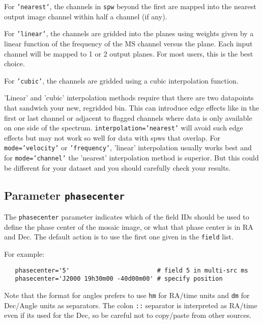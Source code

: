 For {\tt 'nearest'}, the channels in {\tt spw} beyond the first are
mapped into the nearest output image channel within half a channel (if
any).

For {\tt 'linear'}, the channels are gridded into the planes using
weights given by a linear function of the frequency of the MS channel
versus the plane.  Each input channel will be mapped to 1 or 2 output
planes.  For most users, this is the best choice.

For {\tt 'cubic'}, the channels are gridded using a cubic
interpolation function. 

'Linear' and 'cubic' interpolation methods require that there are two
datapoints that sandwich your new, regridded bin. This can introduce
edge effects like in the first or last channel or adjacent to flagged
channels where data is only available on one side of the
spectrum. {\tt interpolation='nearest'} will avoid such edge effects
but may not work so well for data with spws that overlap. For {\tt
  mode='velocity'} or {\tt 'frequency'}, 'linear' interpolation
usually works best and for {\tt mode='channel'} the 'nearest'
interpolation method is superior. But this could be different
for your dataset and you should carefully check your results.

\subsection{Parameter {\tt phasecenter} }
\label{section:im.pars.phasecenter}

The {\tt phasecenter} parameter indicates which of the field IDs 
should be used to define the phase center of the mosaic image,
or what that phase center is in RA and Dec.
The default action is to use the first one given in the 
{\tt field} list.

For example:
\small
\begin{verbatim}
   phasecenter='5'                        # field 5 in multi-src ms
   phasecenter='J2000 19h30m00 -40d00m00' # specify position
\end{verbatim}
\normalsize

Note that the format for angles prefers to use {\tt hm} for RA/time
units and {\tt dm} for Dec/Angle units as separators.  The colon
{\tt ::} separator is interpreted as RA/time even if its used for the
Dec, so be careful not to copy/paste from other sources.


